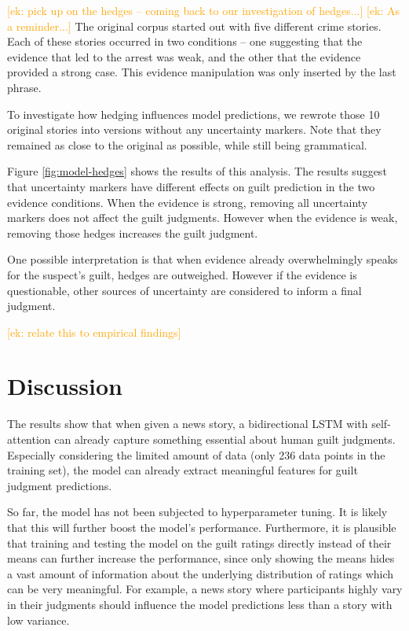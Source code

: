 \documentclass[11pt,a4paper]{article}
\newcommand{\ek}[1]{\textcolor{Orange}{[ek: #1]}}
\begin{document}
\ek{pick up on the hedges -- coming back to our investigation of hedges...}
\ek{As a reminder...} The original corpus started out with five different crime stories. Each of these stories occurred in two conditions -- one suggesting that the evidence that led to the arrest was weak, and the other that the evidence provided a strong case. This evidence manipulation was only inserted by the last phrase.

To investigate how hedging influences model predictions, we rewrote those 10 original stories into versions without any uncertainty markers. Note that they remained as close to the original as possible, while still being grammatical.

Figure \ref{fig:model-hedges} shows the results of this analysis. The results suggest that uncertainty markers have different effects on guilt prediction in the two evidence conditions. When the evidence is strong, removing all uncertainty markers does not affect the guilt judgments. However when the evidence is weak, removing those hedges increases the guilt judgment.

One possible interpretation is that when evidence already overwhelmingly speaks for the suspect's guilt, hedges are outweighed. However if the evidence is questionable, other sources of uncertainty are considered to inform a final judgment.

\ek{relate this to empirical findings}

\section{Discussion}

The results show that when given a news story, a bidirectional LSTM with self-attention can already capture something essential about human guilt judgments. Especially considering the limited amount of data (only 236 data points in the training set), the model can already extract meaningful features for guilt judgment predictions. 

So far, the model has not been subjected to hyperparameter tuning. It is likely that this will further boost the model's performance. Furthermore, it is plausible that training and testing the model on the guilt ratings directly instead of their means can further increase the performance, since only showing the means hides a vast amount of information about the underlying distribution of ratings which can be very meaningful. For example, a news story where participants highly vary in their judgments should influence the model predictions less than a story with low variance.
\end{document}
